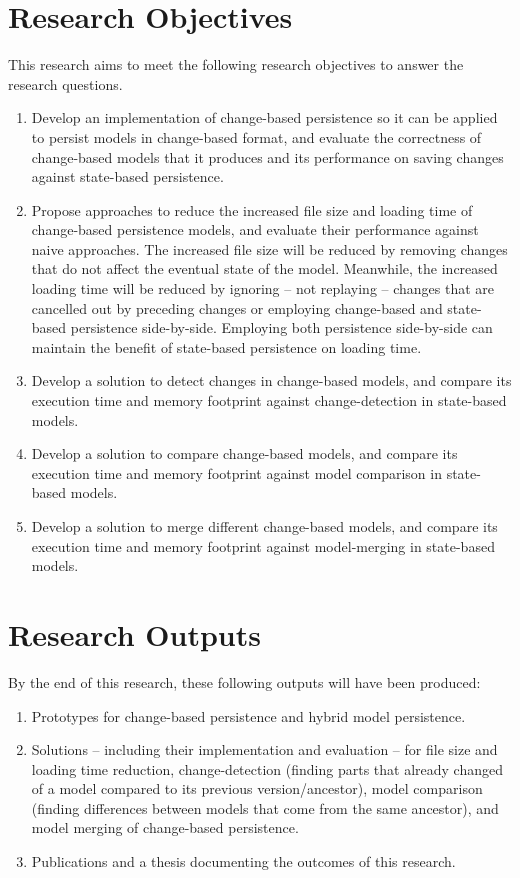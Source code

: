 \documentclass[12pt, a4paper]{report} \usepackage[titletoc]{appendix}
\begin{document}
\section{Research Objectives}
\label{sec:research_objectives}
This research aims to meet the following research objectives to answer the research questions.
\begin{enumerate}
\item Develop an implementation of change-based persistence so it can be applied to persist models in change-based format, and evaluate the correctness of change-based models that it produces and its performance on saving changes against state-based persistence. 
\item Propose approaches to reduce the increased file size and loading time of change-based persistence models, and evaluate their performance against naive approaches. The increased file size will be reduced by removing changes that do not affect the eventual state of the model. Meanwhile, the increased loading time will be reduced by ignoring -- not replaying -- changes that are cancelled out by preceding changes or employing change-based and state-based persistence side-by-side. Employing both persistence side-by-side can maintain the benefit of state-based persistence on loading time. 
\item Develop a solution to detect changes in change-based models, and compare its execution time and memory footprint against change-detection in state-based models.
\item Develop a solution to compare change-based models, and compare its execution time and memory footprint against model comparison in state-based models.
\item Develop a solution to merge different change-based models, and compare its execution time and memory footprint against model-merging in state-based models. 
\end{enumerate}

\section{Research Outputs}
\label{sec:research_outputs}
By the end of this research, these following outputs will have been produced:
\begin{enumerate}
\item Prototypes for change-based persistence and hybrid model persistence. 
\item Solutions -- including their implementation and evaluation -- for file size and loading time reduction, change-detection (finding parts that already changed of a model compared to its previous version/ancestor), model comparison (finding differences between models that come from the same ancestor), and model merging of change-based persistence.
\item Publications and a thesis documenting the outcomes of this research.
\end{enumerate}
\end{document}
